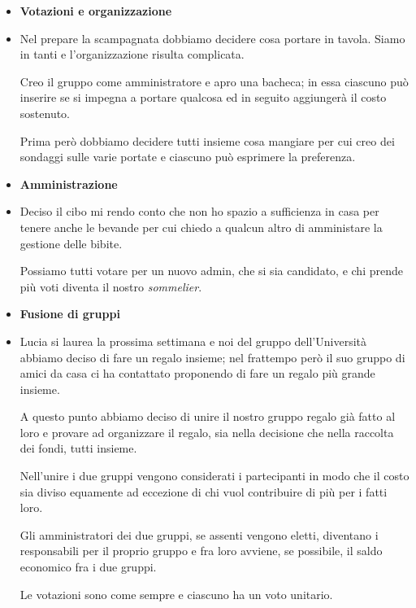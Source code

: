 \documentclass[11pt]{beamer}
\begin{document}
	\begin{frame}
		\begin{itemize}
			\item \textbf{Votazioni e organizzazione}
			
			\item[] Nel prepare la scampagnata dobbiamo decidere cosa portare in tavola. Siamo in tanti e l'organizzazione risulta complicata.
			
			Creo il gruppo come amministratore e apro una bacheca; in essa ciascuno può inserire se si impegna a portare qualcosa ed in seguito aggiungerà il costo sostenuto.
			
			Prima però dobbiamo decidere tutti insieme cosa mangiare per cui creo dei sondaggi sulle varie portate e ciascuno può esprimere la preferenza.
			
			\item \textbf{Amministrazione}
			
			\item[] Deciso il cibo mi rendo conto che non ho spazio a sufficienza in casa per tenere anche le bevande per cui chiedo a qualcun altro di amministare la gestione delle bibite.
			
			Possiamo tutti votare per un nuovo admin, che si sia candidato, e chi prende più voti diventa il nostro \textit{sommelier}.
		\end{itemize}
	\end{frame}

	\begin{frame}
		\begin{itemize}
			\item \textbf{Fusione di gruppi}
			
			\item[] Lucia si laurea la prossima settimana e noi del gruppo dell'Università abbiamo deciso di fare un regalo insieme; nel frattempo però il suo gruppo di amici da casa ci ha contattato proponendo di fare un regalo più grande insieme.
			
			A questo punto abbiamo deciso di unire il nostro gruppo regalo già fatto al loro e provare ad organizzare il regalo, sia nella decisione che nella raccolta dei fondi, tutti insieme.
			
			Nell'unire i due gruppi vengono considerati i partecipanti in modo che il costo sia diviso equamente ad eccezione di chi vuol contribuire di più per i fatti loro.
			
			Gli amministratori dei due gruppi, se assenti vengono eletti, diventano i responsabili per il proprio gruppo e fra loro avviene, se possibile, il saldo economico fra i due gruppi.
			
			Le votazioni sono come sempre e ciascuno ha un voto unitario.
		\end{itemize}
	\end{frame}
	
\end{document}
